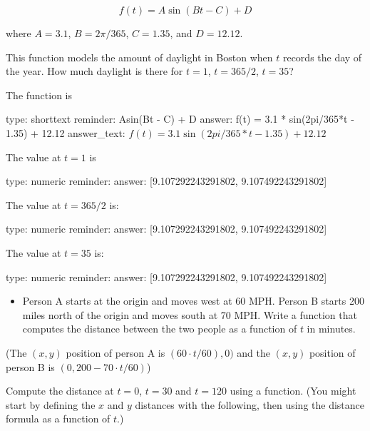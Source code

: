 \documentclass[12pt]{article}
\begin{document}
\[
f(t) = A\sin(Bt - C) + D
\]

where $A=3.1$, $B=2\pi/365$, $C=1.35$, and $D=12.12$.

This function models the amount of daylight in Boston when $t$ records
the day of the year. How much daylight is there for $t=1$, $t=365/2$,
$t = 35$?

The function is

\begin{answer}
type: shorttext
reminder: Asin(Bt - C) + D
answer: f(t) = 3.1 * sin(2pi/365*t - 1.35) + 12.12
answer_text: \( f(t) = 3.1\sin(2pi/365*t - 1.35) + 12.12 \) 
\end{answer}

The value at $t=1$ is

\begin{answer}
    type: numeric
    reminder: 
    answer: [9.107292243291802, 9.107492243291802]

\end{answer}

The value at $t=365/2$ is:

\begin{answer}
    type: numeric
    reminder: 
    answer: [9.107292243291802, 9.107492243291802]

\end{answer}

The value at $t=35$ is:

\begin{answer}
    type: numeric
    reminder: 
    answer: [9.107292243291802, 9.107492243291802]

\end{answer}

\begin{itemize}
\itemsep1pt\parskip0pt
\item
  Person A starts at the origin and moves west at 60 MPH. Person B
  starts 200 miles north of the origin and moves south at 70 MPH. Write
  a function that computes the distance between the two people as a
  function of $t$ in minutes.
\end{itemize}

(The $(x,y)$ position of person A is $(60\cdot t/60), 0)$ and the
$(x,y)$ position of person B is $(0, 200 - 70 \cdot t/60)$)

Compute the distance at $t=0$, $t=30$ and $t=120$ using a function. (You
might start by defining the $x$ and $y$ distances with the following,
then using the distance formula as a function of $t$.)
\end{document}
